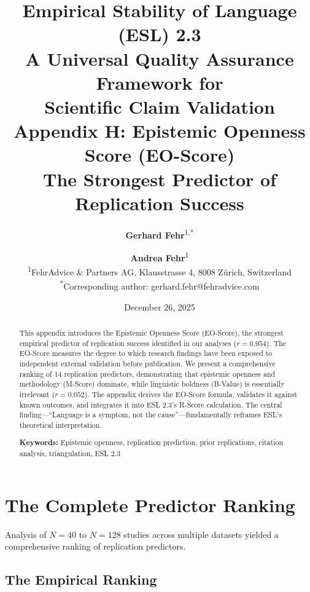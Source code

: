 \documentclass[11pt,a4paper]{article}
\title{%
    \Large \textbf{Empirical Stability of Language (ESL) 2.3} \\[0.5em]
    \large A Universal Quality Assurance Framework for \\
    Scientific Claim Validation \\[1em]
    \LARGE \textbf{Appendix H: Epistemic Openness Score (EO-Score)} \\[0.3em]
    \large The Strongest Predictor of Replication Success
}
\author{%
    \textbf{Gerhard Fehr}\textsuperscript{1,*} \and \textbf{Andrea Fehr}\textsuperscript{1} \\[0.5em]
    \textsuperscript{1}FehrAdvice \& Partners AG, Klausstrasse 4, 8008 Zürich, Switzerland \\[0.3em]
    \textsuperscript{*}Corresponding author: gerhard.fehr@fehradvice.com
}
\date{December 26, 2025}
\begin{document}
\maketitle


\begin{abstract}
\noindent
This appendix introduces the Epistemic Openness Score (EO-Score), the strongest empirical predictor of replication success identified in our analyses ($r = 0.954$). The EO-Score measures the degree to which research findings have been exposed to independent external validation before publication. We present a comprehensive ranking of 14 replication predictors, demonstrating that epistemic openness and methodology (M-Score) dominate, while linguistic boldness (B-Value) is essentially irrelevant ($r = 0.052$). The appendix derives the EO-Score formula, validates it against known outcomes, and integrates it into ESL 2.3's R-Score calculation. The central finding---``Language is a symptom, not the cause''---fundamentally reframes ESL's theoretical interpretation.

\vspace{0.5em}
\noindent\textbf{Keywords:} Epistemic openness, replication prediction, prior replications, citation analysis, triangulation, ESL 2.3
\end{abstract}

\tableofcontents
\newpage


\section{The Complete Predictor Ranking}
\label{sec:ranking}

Analysis of $N = 40$ to $N = 128$ studies across multiple datasets yielded a comprehensive ranking of replication predictors.

\subsection{The Empirical Ranking}
\end{document}
